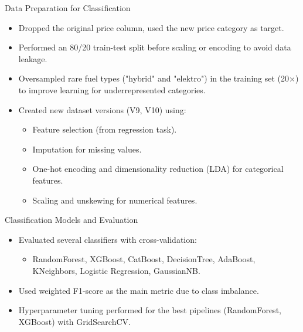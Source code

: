 \documentclass{beamer}
\begin{document}
\begin{frame}{Data Preparation for Classification}
        \begin{itemize}
                \item Dropped the original price column, used the new price
                        category as target.
                \item Performed an 80/20 train-test split before scaling or
                        encoding to avoid data leakage.
                \item Oversampled rare fuel types ("hybrid" and "elektro") in
                        the training set (20$\times$) to improve learning for
                        underrepresented categories.
                \item Created new dataset versions (V9, V10) using:
                        \begin{itemize}
                                \item Feature selection (from regression task).
                                \item Imputation for missing values.
                                \item One-hot encoding and dimensionality
                                        reduction (LDA) for categorical
                                        features.
                                \item Scaling and unskewing for numerical
                                        features.
                        \end{itemize}
        \end{itemize}
\end{frame}


\begin{frame}{Classification Models and Evaluation}
        \begin{itemize}
                \item Evaluated several classifiers with cross-validation:
                        \begin{itemize}
                                \item RandomForest, XGBoost, CatBoost,
                                        DecisionTree, AdaBoost, KNeighbors,
                                        Logistic Regression, GaussianNB.
                        \end{itemize}
                \item Used weighted F1-score as the main metric due to class
                        imbalance.
                \item Hyperparameter tuning performed for the best pipelines
                        (RandomForest, XGBoost) with GridSearchCV.
        \end{itemize}
\end{frame}
\end{document}
